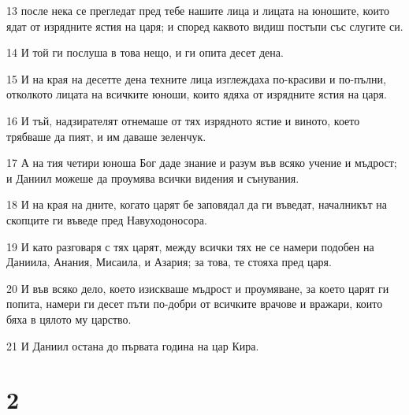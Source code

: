 \par 13 после нека се прегледат пред тебе нашите лица и лицата на юношите, които ядат от изрядните ястия на царя; и според каквото видиш постъпи със слугите си.
\par 14 И той ги послуша в това нещо, и ги опита десет дена.
\par 15 И на края на десетте дена техните лица изглеждаха по-красиви и по-пълни, отколкото лицата на всичките юноши, които ядяха от изрядните ястия на царя.
\par 16 И тъй, надзирателят отнемаше от тях изрядното ястие и виното, което трябваше да пият, и им даваше зеленчук.
\par 17 А на тия четири юноша Бог даде знание и разум във  всяко учение и мъдрост; и Даниил можеше да проумява всички видения и сънувания.
\par 18 И на края на дните, когато царят бе заповядал да ги въведат, началникът на скопците ги въведе пред Навуходоносора.
\par 19 И като разговаря с тях царят, между всички тях не се намери подобен на Даниила, Анания, Мисаила, и Азария; за това, те стояха пред царя.
\par 20 И във всяко дело, което изискваше мъдрост и проумяване, за което царят ги попита, намери ги десет пъти по-добри от всичките врачове и вражари, които бяха в цялото му царство.
\par 21 И Даниил остана до първата година на цар Кира.

\chapter{2}

